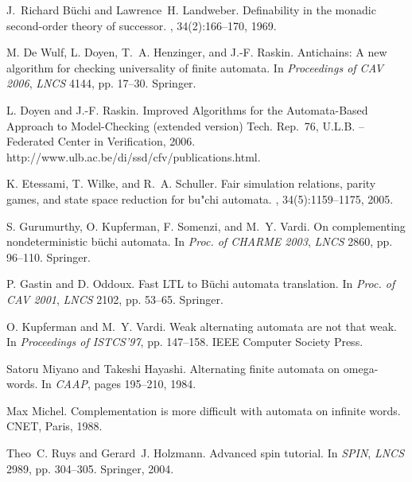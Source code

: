 \documentclass{LMCS}
\begin{document}
\iffalse
\begin{thebibliography}{DDHR06]}

J.~Richard B{\"u}chi and Lawrence~H. Landweber.
\newblock Definability in the monadic second-order theory of successor.
, 34(2):166--170, 1969.



M. {De Wulf}, L. Doyen, T.~A. Henzinger, and J.-F. Raskin.
\newblock Antichains: A new algorithm for checking universality of finite
  automata. \newblock In {\em Proceedings of CAV 2006}, {\em LNCS} 4144, pp. 17--30. Springer.



L. Doyen and J.-F. Raskin.
\newblock Improved Algorithms for the Automata-Based Approach to Model-Checking (extended version)
\newblock Tech. Rep.~76, U.L.B. -- Federated Center in Verification, 2006.
\newblock http://www.ulb.ac.be/di/ssd/cfv/publications.html.


K. Etessami, T. Wilke, and R.~A. Schuller.
\newblock Fair simulation relations, parity games, and state space reduction
  for bu"chi automata.
, 34(5):1159--1175, 2005.

S. Gurumurthy, O. Kupferman, F. Somenzi, and M.~Y. Vardi.
\newblock On complementing nondeterministic b{\"u}chi automata.
\newblock In {\em Proc. of CHARME 2003}, {\em LNCS} 2860, pp. 96--110. Springer.

P. Gastin and D. Oddoux.
\newblock Fast {\sc LTL} to B{\"u}chi automata translation.
\newblock In {\em Proc. of CAV 2001}, {\em LNCS} 2102, pp. 53--65. Springer.

O. Kupferman and M.~Y. Vardi.
\newblock Weak alternating automata are not that weak.
\newblock In {\em Proceedings of {ISTCS}'97}, pp. 147--158. IEEE Computer Society Press.

Satoru Miyano and Takeshi Hayashi.
\newblock Alternating finite automata on omega-words.
\newblock In {\em CAAP}, pages 195--210, 1984.

Max Michel.
\newblock Complementation is more difficult with automata on infinite words.
\newblock CNET, Paris, 1988.

Theo~C. Ruys and Gerard~J. Holzmann.
\newblock Advanced spin tutorial.
\newblock In {\em SPIN}, {\em LNCS} 2989, pp. 304--305. Springer, 2004.


\end{thebibliography}
\end{document}
